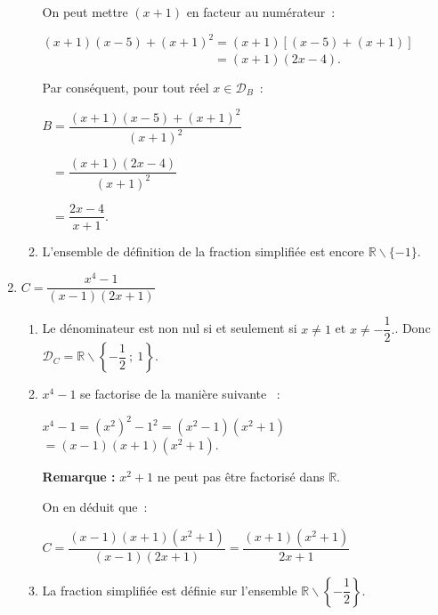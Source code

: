 \begin{corrige}
\begin{enumerate}
\begin{enumerate}[label=\alph*.]
               On peut mettre $(x+1)$ en facteur au numérateur~:
               \par
               $(x+1)(x-5)+(x+1)^2=(x+1)\left[(x-5)+(x+1)\right]$\\
               $\phantom{(x+1)(x-5)+(x+1)^2}=(x+1)(2x-4).$
               \par
               Par conséquent, pour tout réel $x \in \mathscr{D}_B$~:
               \par
               $B=\dfrac{(x+1)(x-5)+(x+1)^2}{(x+1)^2}$
\par
               $\phantom{B}=\dfrac{(x+1)(2x-4)}{(x+1)^2}$
\par
               $\phantom{B}=\dfrac{2x-4}{x+1}.$
               \item %
               L'ensemble de définition de la fraction simplifiée est encore $\mathbb{R} \backslash \{-1\}.$
          \end{enumerate}
          \item %
          $C=\dfrac{x^4-1}{(x-1)(2x+1)}$
          \begin{enumerate}[label=\alph*.]
               \item %
               Le dénominateur est non nul si et seulement si $x \neq 1$ et $x \neq -\dfrac{1}{2}.$. Donc $\mathscr{D}_C=\mathbb{R} \backslash \left\{-\dfrac{1}{2}~;~1\right\}.$
               \item %
               $x^4-1$ se factorise de la manière suivante ~:
               \par
               $x^4-1=(x^2)^2-1^2=(x^2-1)(x^2+1)$\nosp$=(x-1)(x+1)(x^2+1).$
               \par
               \textbf{Remarque : } $x^2+1$ ne peut pas être factorisé dans $\mathbb{R}.$
               \par
               On en déduit que~:
               \par
               $C=\dfrac{(x-1)(x+1)(x^2+1)}{(x-1)(2x+1)}$\nosp$=\dfrac{(x+1)(x^2+1)}{2x+1}$
               \item %
               La fraction simplifiée est définie sur l'ensemble $\mathbb{R} \backslash \left\{ -\dfrac{1}{2} \right\}.$
          \end{enumerate}
     \end{enumerate}
\end{corrige}
